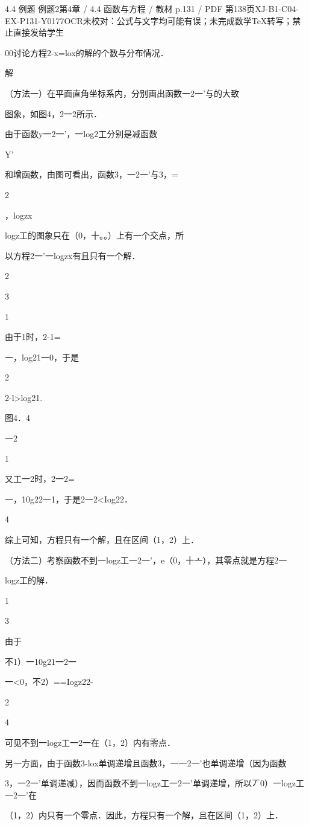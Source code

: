 \begin{bankitem}{4.4 例题 例题2}{第4章 / 4.4 函数与方程 / 教材 p.131 / PDF 第138页}{XJ-B1-C04-EX-P131-Y0177}{OCR未校对：公式与文字均可能有误；未完成数学TeX转写；禁止直接发给学生}
\begin{ocrdraft}
\par
00讨论方程2-x=lox的解的个数与分布情况．
\par
解
\par
（方法一）在平面直角坐标系内，分别画出函数一2一'与的大致
\par
图象，如图4，2一2所示．
\par
由于函数y一2一'，一log2工分别是减函数
\par
Y'
\par
和增函数，由图可看出，函数3，一2一'与3，=
\par
2
\par
，logzx
\par
logz工的图象只在（0，十。。）上有一个交点，所
\par
以方程2一'一logzx有且只有一个解．
\par
2
\par
3
\par
1
\par
由于1时，2-1=
\par
一，log21一0，于是
\par
2
\par
2-l>log21.
\par
图4．4
\par
一2
\par
1
\par
又工一2时，2一2=
\par
一，10g22一1，于是2一2<Iog22．
\par
4
\par
综上可知，方程只有一个解，且在区间（1，2）上．
\par
（方法二）考察函数不到一logz工一2一'，e（0，十亠），其零点就是方程2一
\par
logz工的解．
\par
1
\par
3
\par
由于
\par
不1）一10g21一2一
\par
一<0，不2）==Iogz22-
\par
2
\par
4
\par
可见不到一logz工一2一在（1，2）内有零点．
\par
另一方面，由于函数3-lox单调递增且函数3，一一2一'也单调递增（因为函数
\par
3，一2一'单调递减），因而函数不到一logz工一2一'单调递增，所以丆0）一logz工一2一'在
\par
（1，2）内只有一个零点．因此，方程只有一个解，且在区间（1，2）上．
\end{ocrdraft}
\end{bankitem}
